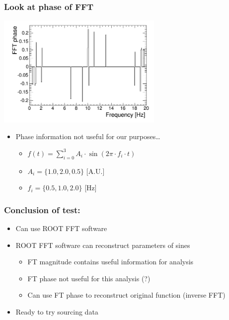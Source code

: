 \documentclass[bigger]{beamer}
\begin{document}
\begin{frame}
\frametitle{Look at phase of FFT}
\label{sec-2-1-4}
\label{sec-2-1-4-1}

\centering
\includegraphics[width=0.6\textwidth]{fig/tutorial_FFT_phase.png}
\begin{itemize}

\item Phase information not useful for our purposes\ldots{}
\label{sec-2-1-4-2}%
\begin{itemize}

\item \(f(t) = \sum_{i = 0}^3 A_{i} \cdot \sin (2\pi \cdot f_{i} \cdot t)\)
\label{sec-2-1-4-2-1}%

\item \(A_{i} = \{1.0, 2.0, 0.5\}\) [A.U.]
\label{sec-2-1-4-2-2}%

\item \(f_{i} = \{0.5, 1.0, 2.0\}\) [Hz]
\label{sec-2-1-4-2-3}%
\end{itemize} %
\end{itemize} %
\end{frame}
\begin{frame}
\frametitle{Conclusion of test:}
\label{sec-2-1-5}
\begin{itemize}

\item Can use ROOT FFT software
\label{sec-2-1-5-1}%

\item ROOT FFT software can reconstruct parameters of sines
\label{sec-2-1-5-2}%
\begin{itemize}

\item FT magnitude contains useful information for analysis
\label{sec-2-1-5-2-1}%

\item FT phase not useful for this analysis (?)
\label{sec-2-1-5-2-2}%

\item Can use FT phase to reconstruct original function (inverse FFT)
\label{sec-2-1-5-2-3}%
\end{itemize} %

\item Ready to try sourcing data
\label{sec-2-1-5-3}%
\end{itemize} %
\end{frame}
\end{document}
